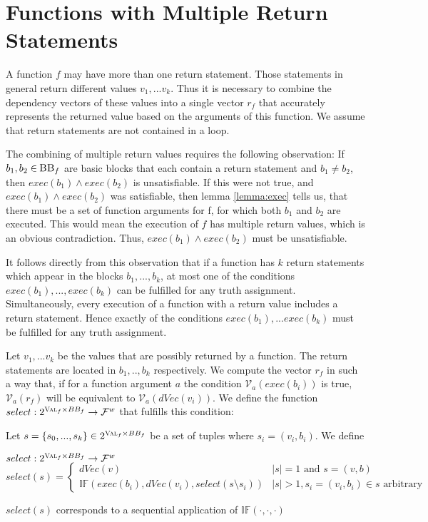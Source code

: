 \section{Functions with Multiple Return Statements}\label{sec:multRet}

A function $f$ may have more than one return statement. Those statements in general return different values $v_1, ... v_k$. Thus it is necessary to combine the dependency vectors of these values into a single vector $r_f$ that accurately represents the returned value based on the arguments of this function. We assume that return statements are not contained in a loop.

The combining of multiple return values requires the following observation: If $b_1, b_2 \in \: \mbb_f$ are basic blocks that each contain a return statement and $b_1 \neq b_2$, then $exec(b_1) \land exec(b_2)$ is unsatisfiable. If this were not true, and $exec(b_1) \land exec(b_2)$ was satisfiable, then lemma \ref{lemma:exec} tells us, that there must be a set of function arguments for f, for which both $b_1$ and $b_2$ are executed. This would mean the execution of $f$ has multiple return values, which is an obvious contradiction. Thus, $exec(b_1) \land exec(b_2)$ must be unsatisfiable.

It follows directly from this observation that if a function has $k$ return statements which appear in the blocks $b_1, ..., b_k$, at most one of the conditions $exec(b_1),..., exec(b_k)$ can be fulfilled for any truth assignment. Simultaneously, every execution of a function with a return value includes a return statement. Hence exactly of the conditions $exec(b_1),... exec(b_k)$ must be fulfilled for any truth assignment.

Let $v_1, ... v_k$ be the values that are possibly returned by a function. The return statements are located in $b_1, .., b_k$ respectively. We compute the vector $r_f$ in such a way that, if for a function argument $a$ the condition $\mathcal{V}_a(exec(b_i))$ is true, $\mathcal{V}_a(r_f)$ will be equivalent to $\mathcal{V}_a(dVec(v_i))$. We define the function $select: 2^{\textsc{Val}_f \times BB_f} \to \mathcal{F}^w$ that fulfills this condition:

\begin{definition}
    Let $s = \{s_0, ..., s_k\} \in 2^{\textsc{Val}_f \times BB_f}$ be a set of tuples where $s_i = (v_i, b_i)$. We define
    \begin{center}
        $select: 2^{\textsc{Val}_f \times BB_f} \to \mathcal{F}^w$
        $select(s) = \begin{cases}
            dVec(v) & |s| = 1 \text{ and } s = {(v, b)} \\
            \mathbb{IF} \left( exec(b_i), dVec(v_i), select(s \setminus s_i) \right) & |s| > 1, s_i = (v_i, b_i) \in s \text{ arbitrary}
        \end{cases}$
    \end{center}
    $select(s)$ corresponds to a sequential application of $\mathbb{IF}(\cdot, \cdot, \cdot)$
\end{definition}

